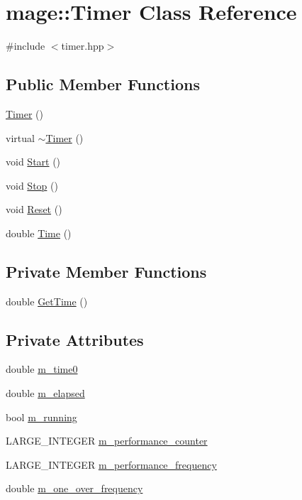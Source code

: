 \hypertarget{classmage_1_1_timer}{}\section{mage\+:\+:Timer Class Reference}
\label{classmage_1_1_timer}


{\ttfamily \#include $<$timer.\+hpp$>$}

\subsection*{Public Member Functions}
\begin{DoxyCompactItemize}
\item 
\hyperlink{classmage_1_1_timer_a5e1c0a3bb4491b3a43ce05874ad24055}{Timer} ()
\item 
virtual \hyperlink{classmage_1_1_timer_aa91cebe8c59c189fde93932fde10265c}{$\sim$\+Timer} ()
\item 
void \hyperlink{classmage_1_1_timer_a5855c9df8ad1a2b6774942e566833647}{Start} ()
\item 
void \hyperlink{classmage_1_1_timer_abf234f1e2ee9e760f316bd49500d5a3a}{Stop} ()
\item 
void \hyperlink{classmage_1_1_timer_a0675ff7bc0a8e7343b5a35f865cc9c1a}{Reset} ()
\item 
double \hyperlink{classmage_1_1_timer_a5e4655ac296cc8971b54e5a76082f00f}{Time} ()
\end{DoxyCompactItemize}
\subsection*{Private Member Functions}
\begin{DoxyCompactItemize}
\item 
double \hyperlink{classmage_1_1_timer_ab6ae538071bb62bdf86de5344788c124}{Get\+Time} ()
\end{DoxyCompactItemize}
\subsection*{Private Attributes}
\begin{DoxyCompactItemize}
\item 
double \hyperlink{classmage_1_1_timer_a73fa08d14bfa273f158f967a8e58f96f}{m\+\_\+time0}
\item 
double \hyperlink{classmage_1_1_timer_aa2c50b9ffa85600791a21e2db4c43e91}{m\+\_\+elapsed}
\item 
bool \hyperlink{classmage_1_1_timer_ac8d975843e5b2199848284de910d3291}{m\+\_\+running}
\item 
L\+A\+R\+G\+E\+\_\+\+I\+N\+T\+E\+G\+ER \hyperlink{classmage_1_1_timer_a70bdbf53f8cd69a46db8b75e08d3ead8}{m\+\_\+performance\+\_\+counter}
\item 
L\+A\+R\+G\+E\+\_\+\+I\+N\+T\+E\+G\+ER \hyperlink{classmage_1_1_timer_a1618c4901b6f898165a2d79d02a2518e}{m\+\_\+performance\+\_\+frequency}
\item 
double \hyperlink{classmage_1_1_timer_a8e73b09880114bc7ab47c8698a40c976}{m\+\_\+one\+\_\+over\+\_\+frequency}
\end{DoxyCompactItemize}


